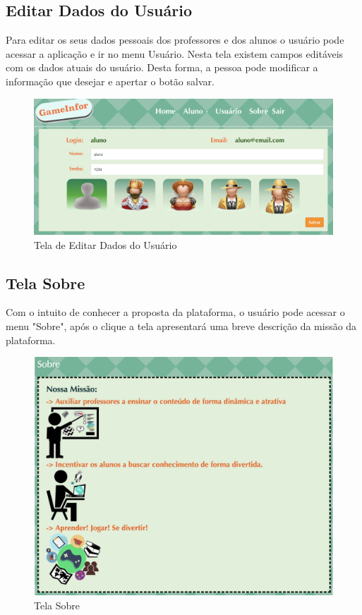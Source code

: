 \subsection{Editar Dados do Usuário}

Para editar os seus dados pessoais dos professores e dos alunos o usuário pode acessar a aplicação e ir no menu Usuário. Nesta tela existem campos editáveis com  os dados atuais do usuário. Desta forma, a pessoa pode modificar a informação que desejar e apertar o botão salvar.

\begin{figure}[H]
  \centering
  \includegraphics[scale=0.37]{images/proposta-img/Figura4-13.png}
  \caption{Tela de Editar Dados do Usuário}
  \label{fig:Figura4-13}
\end{figure}

\subsection{Tela Sobre}

Com o intuito de conhecer a proposta da plataforma, o usuário pode acessar o menu "Sobre", após o clique a tela apresentará uma breve descrição da missão da plataforma.

\begin{figure}[H]
  \centering
  \includegraphics[scale=0.55]{images/proposta-img/Figura4-14.png}
  \caption{Tela Sobre}
  \label{fig:Figura4-14}
\end{figure}


